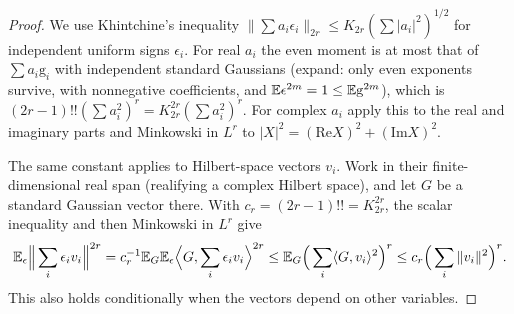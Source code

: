 \begin{proof}
We use Khintchine's inequality $\|\sum a_i\epsilon_i\|_{2r}\le
K_{2r}(\sum|a_i|^2)^{1/2}$ for independent uniform signs $\epsilon_i$. For real
$a_i$ the even moment is at most that of $\sum a_i\mathrm g_i$ with independent
standard Gaussians (expand: only even exponents survive, with nonnegative
coefficients, and $\mathbb E\epsilon^{2m}=1\le\mathbb E\mathrm g^{2m}$), which is
$(2r-1)!!(\sum a_i^2)^r=K_{2r}^{2r}(\sum a_i^2)^r$. For complex $a_i$ apply this
to the real and imaginary parts and Minkowski in $L^r$ to
$|X|^2=(\mathrm{Re}X)^2+(\mathrm{Im}X)^2$.

The same constant applies to Hilbert-space vectors $v_i$. Work in their
finite-dimensional real span (realifying a complex Hilbert space), and let
$G$ be a standard Gaussian vector there. With $c_r=(2r-1)!!=K_{2r}^{2r}$,
the scalar inequality and then Minkowski in $L^r$ give
\[
 \mathbb E_\epsilon\Big\|\sum_i\epsilon_i v_i\Big\|^{2r}
 =c_r^{-1}\mathbb E_G\mathbb E_\epsilon
       \Big\langle G,\sum_i\epsilon_i v_i\Big\rangle^{2r}
 \le\mathbb E_G\Big(\sum_i\langle G,v_i\rangle^2\Big)^r
 \le c_r\Big(\sum_i\|v_i\|^2\Big)^r.
\]
This also holds conditionally when the vectors depend on other variables.


\end{proof}
